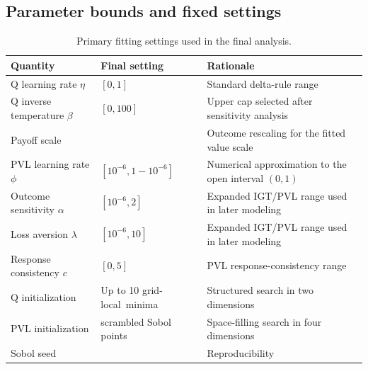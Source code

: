 \subsection{Parameter bounds and fixed settings}

\begin{table}[H]
    \centering
    \caption{Primary fitting settings used in the final analysis.}\label{tab:fitting-settings}
    \small
    \begin{tabular}{@{}
        >{\RaggedRight\arraybackslash}p{}
        >{\RaggedRight\arraybackslash}p{}
        >{\RaggedRight\arraybackslash}p{}
        @{}}
        \toprule
        Quantity                        & Final setting              & Rationale                                              \\
        \midrule
        Q learning rate \(\eta\)        & \([0,1]\)                  & Standard delta-rule range                              \\
        Q inverse temperature \(\beta\) & \([0,100]\)                & Upper cap selected after sensitivity analysis          \\
        Payoff scale                    & 100                        & Outcome rescaling for the fitted value scale           \\
        PVL learning rate \(\phi\)      & \([10^{-6},1-10^{-6}]\)    & Numerical approximation to the open interval \((0,1)\) \\
        Outcome sensitivity \(\alpha\)  & \([10^{-6},2]\)            & Expanded IGT/PVL range used in later modeling~\cite{haines2018} \\
        Loss aversion \(\lambda\)       & \([10^{-6},10]\)           & Expanded IGT/PVL range used in later modeling~\cite{haines2018} \\
        Response consistency \(c\)      & \([0,5]\)                  & PVL response-consistency range~\cite{ahn2008}          \\
        Q initialization                & Up to 10 \mbox{grid-local minima} & Structured search in two dimensions                    \\
        PVL initialization              & 32 scrambled Sobol points  & Space-filling search in four dimensions                \\
        Sobol seed                      & 42                         & Reproducibility                                        \\
        \bottomrule
    \end{tabular}
\end{table}
